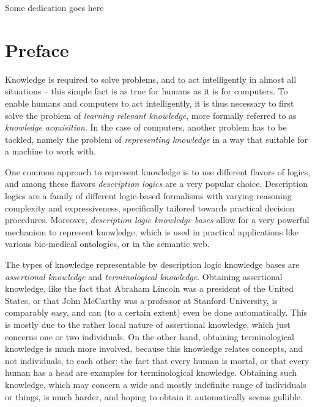 \vspace*{0.38196601125\textheight}
\begin{center}
  Some dedication goes here
\end{center}

\chapter*{Preface}
\label{cha:preface}

\thispagestyle{empty}

Knowledge is required to solve problems, and to act intelligently in almost all situations
-- this simple fact is as true for humans as it is for computers.  To enable humans and
computers to act intelligently, it is thus necessary to first solve the problem of
\emph{learning relevant knowledge}, more formally referred to as \emph{knowledge
  acquisition}.  In the case of computers, another problem has to be tackled, namely the
problem of \emph{representing knowledge} in a way that suitable for a machine to work
with.

One common approach to represent knowledge is to use different flavors of logics, and
among these flavors \emph{description logics} are a very popular choice.  Description
logics are a family of different logic-based formalisms with varying reasoning complexity
and expressiveness, specifically tailored towards practical decision procedures.
Moreover, \emph{description logic knowledge bases} allow for a very powerful mechanism to
represent knowledge, which is used in practical applications like various bio-medical
ontologies, or in the semantic web.

The types of knowledge representable by description logic knowledge bases are
\emph{assertional knowledge} and \emph{terminological knowledge}.  Obtaining assertional
knowledge, like the fact that Abraham Lincoln was a president of the United States, or
that John McCarthy was a professor at Stanford University, is comparably easy, and can (to
a certain extent) even be done automatically.  This is mostly due to the rather local
nature of assertional knowledge, which just concerns one or two individuals.  On the other
hand, obtaining terminological knowledge is much more involved, because this knowledge
relates concepts, and not individuals, to each other: the fact that every human is mortal,
or that every human has a head are examples for terminological knowledge.  Obtaining such
knowledge, which may concern a wide and mostly indefinite range of individuals or things,
is much harder, and hoping to obtain it automatically seems gullible.

